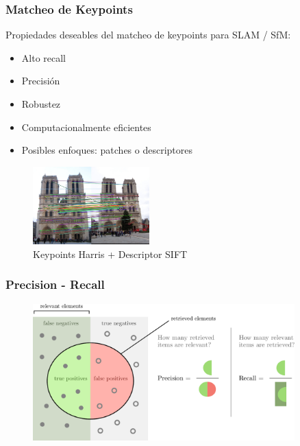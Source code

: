 \begin{frame}
    \frametitle{Matcheo de Keypoints}
    \footnotesize
    Propiedades deseables del matcheo de keypoints para SLAM / SfM:
    \begin{itemize}
        \item Alto recall
        \item Precisión
        \item Robustez
        \item Computacionalmente eficientes
        \item Posibles enfoques: patches o descriptores
    \end{itemize}
    
    \begin{figure}
        \includegraphics[width=0.4\textwidth]{./images/matching_notredam.jpg}
        \caption{Keypoints Harris + Descriptor SIFT}
    \end{figure}
\end{frame}

\begin{frame}
    \frametitle{Precision - Recall}
    \footnotesize
    
    
    \begin{figure}
        \includegraphics[width=0.9\textwidth]{./images/precision_recall.pdf}
    \end{figure}
\end{frame}

